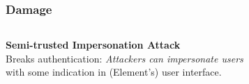 \documentclass[aspectratio=169]{beamer}
\begin{document}
\begin{frame}
  \frametitle{Damage}
  \begin{columns}[t]
  \begin{column}{0.3\columnwidth}
    \textbf{Semi-trusted Impersonation Attack}\\
    \vspace{1em}
    Breaks authentication: \emph{Attackers can impersonate users} \\
    \vspace{1em}
    with some indication in (Element's) user interface.
  \end{column}
  \begin{column}{0.3\columnwidth}
  \end{column}
  \begin{column}{0.3\columnwidth}
  \end{column}
  \end{columns}

\end{frame}
\end{document}
